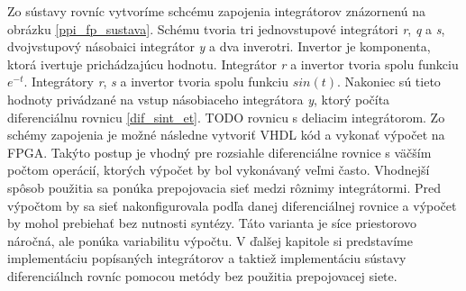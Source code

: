 Zo sústavy rovníc vytvoríme schcému zapojenia integrátorov znázornenú na obrázku \ref{ppi_fp_sustava}. Schému tvoria tri jednovstupové integrátori \textit{r}, \textit{q} a \textit{s}, dvojvstupový násobaici integrátor \textit{y} a dva inverotri. Invertor je komponenta, ktorá ivertuje prichádzajúcu hodnotu. Integrátor \textit{r} a invertor tvoria spolu funkciu $ e^{-t} $. Integrátory \textit{r}, \textit{s} a invertor tvoria spolu funkciu $ sin(t) $. Nakoniec sú tieto hodnoty privádzané na vstup násobiaceho integrátora \textit{y}, ktorý počíta diferenciálnu rovnicu \ref{dif_sint_et}.
TODO rovnicu s deliacim integrátorom.
Zo schémy zapojenia je možné následne vytvoriť VHDL kód a vykonať výpočet na FPGA. Takýto postup je vhodný pre rozsiahle diferenciálne rovnice s väčším počtom operácií, ktorých výpočet by bol vykonávaný veľmi často. Vhodnejší spôsob použitia sa ponúka prepojovacia sieť medzi rôznimy integrátormi. Pred výpočtom by sa sieť nakonfigurovala podľa danej diferenciálnej rovnice a výpočet by mohol prebiehať bez nutnosti syntézy. Táto varianta je síce priestorovo náročná, ale ponúka variabilitu výpočtu.
V ďalšej kapitole si predstavíme implementáciu popísaných integrátorov a taktiež implementáciu sústavy diferenciálnch rovníc pomocou metódy bez použitia prepojovacej siete.
\bigskip

